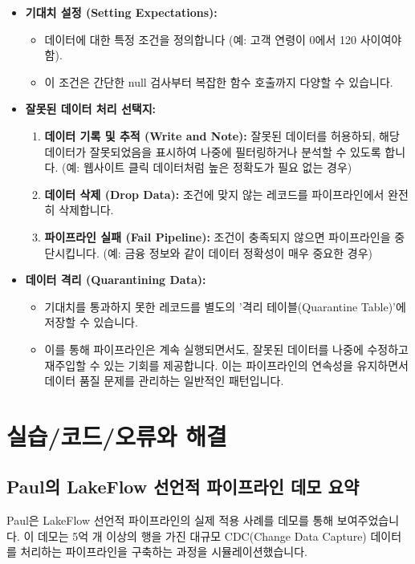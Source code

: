 \documentclass[11pt,a4paper]{article}
\begin{document}
\begin{enumerate}
\begin{itemize}
    \item \textbf{기대치 설정 (Setting Expectations):}
    \begin{itemize}
        \item 데이터에 대한 특정 조건을 정의합니다 (예: 고객 연령이 0에서 120 사이여야 함).
        \item 이 조건은 간단한 null 검사부터 복잡한 함수 호출까지 다양할 수 있습니다.
    \end{itemize}
    \item \textbf{잘못된 데이터 처리 선택지:}
    \begin{enumerate}
        \item \textbf{데이터 기록 및 추적 (Write and Note):} 잘못된 데이터를 허용하되, 해당 데이터가 잘못되었음을 표시하여 나중에 필터링하거나 분석할 수 있도록 합니다. (예: 웹사이트 클릭 데이터처럼 높은 정확도가 필요 없는 경우)
        \item \textbf{데이터 삭제 (Drop Data):} 조건에 맞지 않는 레코드를 파이프라인에서 완전히 삭제합니다.
        \item \textbf{파이프라인 실패 (Fail Pipeline):} 조건이 충족되지 않으면 파이프라인을 중단시킵니다. (예: 금융 정보와 같이 데이터 정확성이 매우 중요한 경우)
    \end{enumerate}
    \item \textbf{데이터 격리 (Quarantining Data):}
    \begin{itemize}
        \item 기대치를 통과하지 못한 레코드를 별도의 '격리 테이블(Quarantine Table)'에 저장할 수 있습니다.
        \item 이를 통해 파이프라인은 계속 실행되면서도, 잘못된 데이터를 나중에 수정하고 재주입할 수 있는 기회를 제공합니다. 이는 파이프라인의 연속성을 유지하면서 데이터 품질 문제를 관리하는 일반적인 패턴입니다.
    \end{itemize}
\end{itemize}

\newpage
\section*{\centering 실습/코드/오류와 해결}

\subsection{Paul의 LakeFlow 선언적 파이프라인 데모 요약}

Paul은 LakeFlow 선언적 파이프라인의 실제 적용 사례를 데모를 통해 보여주었습니다. 이 데모는 5억 개 이상의 행을 가진 대규모 CDC(Change Data Capture) 데이터를 처리하는 파이프라인을 구축하는 과정을 시뮬레이션했습니다.


\end{enumerate}
\end{document}
